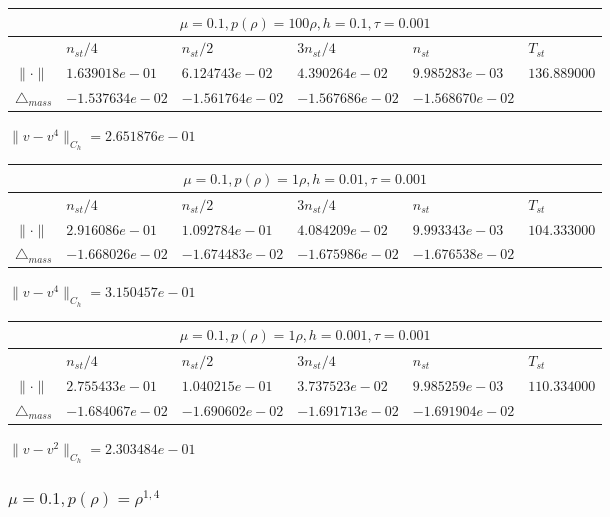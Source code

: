 \begin{tabular}{*{6}{|l}|}
    \hline
     \\
    \hline
    &$n_{st}/4 $&$ n_{st}/2$&$3n_{st}/4$&$n_{st}$&$T_{st}$ \\
    \hline
$\|\cdot \|$& $1.639018e-01$ & $6.124743e-02$ & $4.390264e-02$ & $9.985283e-03$ &$136.889000$\\
\hline
$\triangle_{mass}$& $-1.537634e-02$ & $-1.561764e-02$ & $-1.567686e-02$ & $-1.568670e-02$ &\\
\hline    
\end{tabular}

$\|v-v^{4}\|_{C_h} = 2.651876e-01$

\begin{tabular}{*{6}{|l}|}
    \hline
     \\
    \hline
    &$n_{st}/4 $&$ n_{st}/2$&$3n_{st}/4$&$n_{st}$&$T_{st}$ \\
    \hline
    $\|\cdot \|$& $2.916086e-01$ & $1.092784e-01$ & $4.084209e-02$ & $9.993343e-03$ &$104.333000$\\
\hline
$\triangle_{mass}$& $-1.668026e-02$ & $-1.674483e-02$ & $-1.675986e-02$ & $-1.676538e-02$ &\\
\hline
\end{tabular}

$\|v-v^{4}\|_{C_h} = 3.150457e-01$


\begin{tabular}{*{6}{|l}|}
    \hline
     \\
    \hline
    &$n_{st}/4 $&$ n_{st}/2$&$3n_{st}/4$&$n_{st}$&$T_{st}$ \\
    \hline
$\|\cdot \|$& $2.755433e-01$ & $1.040215e-01$ & $3.737523e-02$ & $9.985259e-03$ &$110.334000$\\
\hline
$\triangle_{mass}$& $-1.684067e-02$ & $-1.690602e-02$ & $-1.691713e-02$ & $-1.691904e-02$ &\\
\hline

\end{tabular}

$\|v-v^{2}\|_{C_h} = 2.303484e-01$

\subsubsection{$\mu = 0.1, p(\rho) = \rho^{1,4} $}

